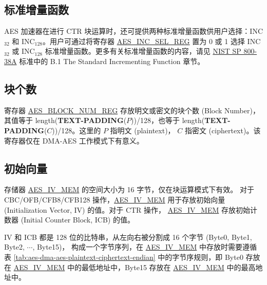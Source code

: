 \documentclass[main\_\_CN.tex]{subfiles}
\begin{document}
\subsection{标准增量函数}\label{sec:aes-Standard-Incrementing-Function}

AES 加速器在进行 CTR 块运算时，还可提供两种标准增量函数供用户选择：INC$_{32}$ 和 INC$_{128}$。用户可通过将寄存器 \hyperref[regdesc:AESINCSELREG]{AES\_INC\_SEL\_REG} 置为 0 或 1 选择 INC$_{32}$ 或 INC$_{128}$ 标准增量函数。更多有关标准增量函数的内容，请见 \href{https://nvlpubs.nist.gov/nistpubs/Legacy/SP/nistspecialpublication800-38a.pdf}{NIST SP 800-38A} 标准中的 B.1 The Standard Incrementing Function 章节。

\subsection{块个数}\label{sec:aes-block-number}

寄存器 \hyperref[regdesc:AESBLOCKNUMREG]{AES\_BLOCK\_NUM\_REG} 存放明文或密文的块个数 (Block Number)，其值等于 length({\bfseries TEXT-PADDING}($P$))/128，也等于 length({\bfseries TEXT-PADDING}($C$))/128。这里的 $P$ 指明文 (plaintext)， $C$ 指密文 (ciphertext)。该寄存器仅在 DMA-AES 工作模式下有意义。

\subsection{初始向量}\label{sec:aes-init-vector}

\label{memdesc:AESIVMEM} 存储器 \hyperref[memdesc:AESIVMEM]{AES\_IV\_MEM} 的空间大小为 16 字节，仅在块运算模式下有效。
对于 CBC/OFB/CFB8/CFB128 操作，\hyperref[memdesc:AESIVMEM]{AES\_IV\_MEM} 用于存放初始向量 (Initialization Vector, IV) 的值。对于 CTR 操作， \hyperref[memdesc:AESIVMEM]{AES\_IV\_MEM}  存放初始计数器 (Initial Counter Block, ICB) 的值。

IV 和 ICB 都是 128 位的比特串，从左向右被分割成 16 个字节 (Byte0, Byte1, Byte2, \begin{math}\cdots\end{math}, Byte15)， 构成一个字节序列，在 \hyperref[memdesc:AESIVMEM]{AES\_IV\_MEM} 中存放时需要遵循表 \ref{tab:aes-dma-aes-plaintext-ciphertext-endian} 中的字节序规则，即 Byte0 存放在 \hyperref[memdesc:AESIVMEM]{AES\_IV\_MEM} 中的最低地址中，Byte15 存放在 \hyperref[memdesc:AESIVMEM]{AES\_IV\_MEM} 中的最高地址中。
\end{document}
